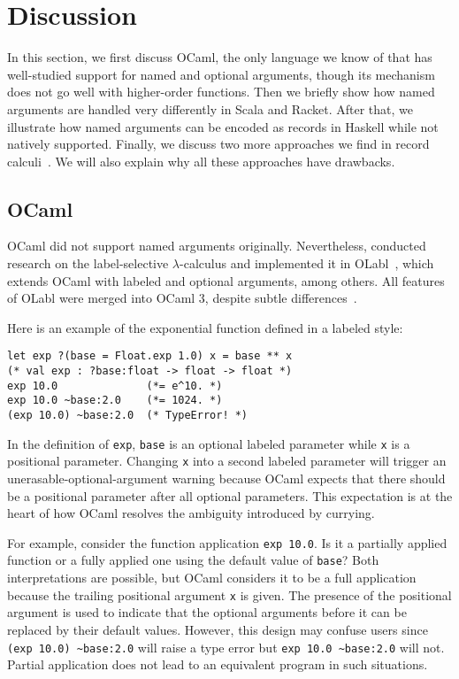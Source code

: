 \section{Discussion} \label{sec:related}

In this section, we first discuss OCaml, the only language we know of that has
well-studied support for named and optional arguments, though its mechanism does
not go well with higher-order functions. Then we briefly show how named
arguments are handled very differently in Scala and Racket. After that, we
illustrate how named arguments can be encoded as records in Haskell while not
natively supported. Finally, we discuss two more approaches we find in record
calculi~\citep{ohori1995polymorphic,osinski2006polymorphic}. We will also
explain why all these approaches have drawbacks.

\subsection{OCaml}

OCaml did not support named arguments originally. Nevertheless,
\citet{garrigue1994label} conducted research on the label-selective
$\lambda$-calculus and implemented it in OLabl~\citep{olabl}, which extends
OCaml with labeled and optional arguments, among others. All features of OLabl
were merged into OCaml 3, despite subtle
differences~\citep{garrigue2001labeled}.

Here is an example of the exponential function defined in a labeled style:

\begin{lstlisting}[language={[Objective]Caml}]
let exp ?(base = Float.exp 1.0) x = base ** x
(* val exp : ?base:float -> float -> float *)
exp 10.0              (*= e^10. *)
exp 10.0 ~base:2.0    (*= 1024. *)
(exp 10.0) ~base:2.0  (* TypeError! *)
\end{lstlisting}

\noindent In the definition of \lstinline{exp}, \lstinline{base} is an optional
labeled parameter while \lstinline{x} is a positional parameter. Changing
\lstinline{x} into a second labeled parameter will trigger an
unerasable-optional-argument warning because OCaml expects that there should be
a positional parameter after all optional parameters. This expectation is at the
heart of how OCaml resolves the ambiguity introduced by currying.

For example, consider the function application \lstinline{exp 10.0}. Is it a
partially applied function or a fully applied one using the default value of
\lstinline{base}? Both interpretations are possible, but OCaml considers it to
be a full application because the trailing positional argument \lstinline{x} is
given. The presence of the positional argument is used to indicate that the
optional arguments before it can be replaced by their default values. However,
this design may confuse users since \lstinline{(exp 10.0) ~base:2.0} will raise
a type error but \lstinline{exp 10.0 ~base:2.0} will not. Partial application
does not lead to an equivalent program in such situations.

